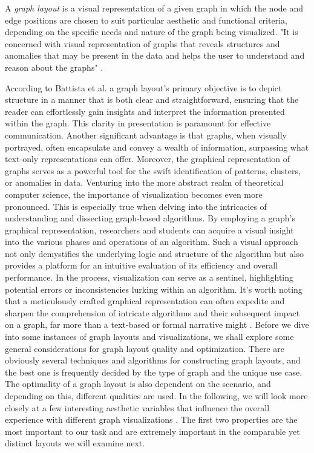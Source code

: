 \documentclass[bachelor, english]{algothesis}
\begin{document}
\begin{definition}
    A \emph{graph layout} is a visual representation of a given graph in which the node and edge positions are chosen to suit particular aesthetic and functional criteria, depending on the specific needs and nature of the graph being visualized. "It is concerned with visual representation of graphs that reveals structures and anomalies that may be present in the data and helps the user to understand and reason about the graphs" \cite{layot_definition}.
\end{definition}
\noindent
According to Battista et al. \cite{Visualization} a graph layout's primary objective is to depict structure in a manner that is both clear and straightforward, ensuring that the reader can effortlessly gain insights and interpret the information presented within the graph. This clarity in presentation is paramount for effective communication. Another significant advantage is that graphs, when visually portrayed, often encapsulate and convey a wealth of information, surpassing what text-only representations can offer. Moreover, the graphical representation of graphs serves as a powerful tool for the swift identification of patterns, clusters, or anomalies in data. 
\newline
Venturing into the more abstract realm of theoretical computer science, the importance of visualization becomes even more pronounced. This is especially true when delving into the intricacies of understanding and dissecting graph-based algorithms. By employing a graph's graphical representation, researchers and students can acquire a visual insight into the various phases and operations of an algorithm. Such a visual approach not only demystifies the underlying logic and structure of the algorithm but also provides a platform for an intuitive evaluation of its efficiency and overall performance. In the process, visualization can serve as a sentinel, highlighting potential errors or inconsistencies lurking within an algorithm. It's worth noting that a meticulously crafted graphical representation can often expedite and sharpen the comprehension of intricate algorithms and their subsequent impact on a graph, far more than a text-based or formal narrative might \cite{Visualization}. 
\newline
Before we dive into some instances of graph layouts and visualizations, we shall explore some general considerations for graph layout quality and optimization. There are obviously several techniques and algorithms for constructing graph layouts, and the best one is frequently decided by the type of graph and the unique use case. The optimality of a graph layout is also dependent on the scenario, and depending on this, different qualities are used. In the following, we will look more closely at a few interesting aesthetic variables that influence the overall experience with different graph visualizations \cite{aesthetic}. The first two properties are the most important to our task and are extremely important in the comparable yet distinct layouts we will examine next. 
\end{document}
